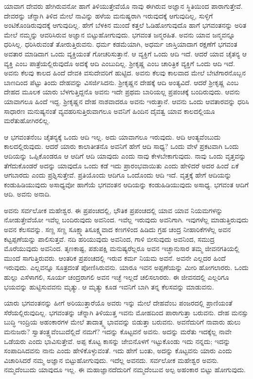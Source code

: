 ಯಾವಾಗ ದೇವರು ಹೇಗಿರುವನೋ ಹಾಗೆ ತಿಳಿಯುತ್ತೇವೆಯೊ ನಾವು ಈಗಿರುವ ಅಜ್ಞಾನ ಸ್ಥಿತಿಯಿಂದ ಪಾರಾಗುತ್ತೇವೆ. ದೇವರನ್ನು ಚೆನ್ನಾಗಿ ತಿಳಿದ ಮೇಲೆ ನಾವಿನ್ನು ಹಳೆಯ ಮನುಷ್ಯರಾಗಿ ಇರುವುದಕ್ಕೆ ಆಗುವುದಿಲ್ಲ, ಸುಳ್ಳಿಗೆ ಅಂಟಿಕೊಂಡಿರುವುದಕ್ಕೆ ಆಗುವುದಿಲ್ಲ. ಹೇಗೆ ಬೆಳಕಿನ ಮುಂದೆ ಕತ್ತಲೆ ಓಡಿಹೋಗುವುದೊ ಹಾಗೆ ಭಗವಂತನನ್ನು ಅರಿತ ಮೇಲೆ ನಮ್ಮನ್ನು ಆವರಿಸಿರುವ ಅಜ್ಞಾನ ಬಿಟ್ಟುಹೋಗುವುದು. ಭಗವಂತ ಜನ್ಮರಹಿತ. ಅವನು ಯಾವ ಜನ್ಮವನ್ನೂ ಧರಿಸಿಲ್ಲ. ಧರಿಸಿರುವಂತೆ ತೋರುತ್ತಿರುವನು. ಧರ್ಮ ಕಡಮೆಯಾಗಿ, ಅಧರ್ಮ ಜಾಸ್ತಿಯಾದಾಗ ರಕ್ಷಣೆಗೆ ಭಗವಂತ ಅವತಾರ ಮಾಡಿದಾಗ ಒಂದು ವ್ಯಕ್ತಿಯಂತೆ ಗೋಚರಿಸುತ್ತಾನೆ. ಆ ವ್ಯಕ್ತಿಗೆ ಒಂದು ಆದಿ ಇದೆ. ಆದರೆ ಯಾವ ಚೈತನ್ಯ ಆ ವ್ಯಕ್ತಿ ಎಂಬ ಪಾತ್ರೆಯಲ್ಲಿರುವುದೊ ಅದಕ್ಕೆ ಆದಿ ಎಂಬುದಿಲ್ಲ. ಶ‍್ರೀಕೃಷ್ಣ ಎಂಬ ಚಾರಿತ್ರಿಕ ವ್ಯಕ್ತಿಗೆ ಒಂದು ಆದಿ ಇದೆ. ಅವನು ಕೆಲವು ಕಾಲದ ಹಿಂದೆ ದೇವಕಿ ವಸುದೇವರಿಗೆ ಹುಟ್ಟಿದ. ಅವನು ಕೆಲವು ಕಾಲವಾದ ಮೇಲೆ ಬೇಟೆಗಾರನೊಬ್ಬನ ಬಾಣದಿಂದ ಪೆಟ್ಟು ತಿಂದು ದೇಹವನ್ನು ವಿಸರ್ಜಿಸಿದನು. ಶ‍್ರೀಕೃಷ್ಣನ ದೇಹಕ್ಕೆ ಆದಿ ಅಂತ್ಯವಿದೆ. ಆದರೆ ಶ‍್ರೀಕೃಷ್ಣ ಎಂಬ ದೇಹದ ಮೂಲಕ ಯಾರು ಬೆಳಗುತ್ತಿದ್ದನೊ ಅವನು ಇದೇ ಪ್ರಥಮ ಬಾರಿಯಲ್ಲ ಪ್ರಪಂಚಕ್ಕೆ ಬಂದಿರುವುದು. ಆವನು ಯಾವಾಗಲೂ ಹಿಂದೆ ಇದ್ದ. ಶ‍್ರೀಕೃಷ್ಣನ ದೇಹ ನಾಶವಾದರೂ ಅವನು ಇರುತ್ತಾನೆ. ಆವನು ಒಂದು ಆವತಾರವನ್ನು ಧರಿಸಿ ಸಾಧಾರಣ ಮನುಷ್ಯನಂತೆ ವ್ಯವಹರಿಸುತ್ತಿರುವಾಗಲೂ ಅವನಿಗೆ ಹಿಂದಿನ ದೈವತ್ವ ಯಾವ ಕಾಲದಲ್ಲಿಯೂ ಮರೆತುಹೋಗಿರಲಿಲ್ಲ.

ಆ ಭಗವಂತನೆಂಬ ಚೈತನ್ಯಕ್ಕೆ ಒಂದು ಆದಿ ಇಲ್ಲ. ಅದು ಯಾವಾಗಲೂ ಇರುವುದು. ಆದಿ ಆಂತ್ಯವೆಂಬುದು ಕಾಲದಲ್ಲಿರುವುದು. ಆದರೆ ಯಾರು ಕಾಲಾತೀತನೊ ಅವನಿಗೆ ಹೇಗೆ ಆದಿ ಸಾಧ್ಯ? ಒಂದು ವೇಳೆ ಪ್ರಕಟವಾಗಿ ಒಂದು ಆದಿಯನ್ನು ಒಪ್ಪಿಕೊಂಡರೂ ಆ ಆದಿಗೆ ಆದಿ ಯಾವುದು ಎಂದು ನಾವು ಕೇಳಬೇಕಾಗುವುದು. ನಾವು ಒಂದು ವೃತ್ತವನ್ನು ತೆಗೆದುಕೊಂಡರೆ ಅದನ್ನು ಯಾವುದೊ ಒಂದು ಕಡೆ ಇದು ಪ್ರಾರಂಭವಾಯಿತು ಎಂದು ಹೇಳಿದರೆ ಅದರ ಹಿಂದೆ ಏಕೆ ಆಗಬಾರದು ಎಂದು ಪ್ರಶ್ನಿಸುತ್ತೇವೆ. ಪ್ರತಿಯೊಂದು ಆದಿಗೂ ಒಂದೊಂದು ಆದಿ ಇದೆ. ವೃತ್ತಕ್ಕೆ ಹೇಗೆ ಆದಿಯನ್ನು ಕಂಡುಹಿಡಿಯುವುದು ಅಸಾಧ್ಯವೋ ಹಾಗೆಯೆ ಭಗವಂತನ ಆದಿಯನ್ನು ಕಂಡುಹಿಡಿಯುವುದು ಅಸಾಧ್ಯ. ಭಗವಂತ ಆದಿಗೆ ಆದಿ. ಅವನು ಅನಾದಿ.

\newpage

ಅವನು ಸರ್ವಲೋಕ ಮಹೇಶ್ವರ. ಈ ಪ್ರಪಂಚದಲ್ಲಿ, ಭೌತಿಕ ಪ್ರಪಂಚದಲ್ಲಿ ಯಾವ ಯಾವ ನಿಯಮಗಳನ್ನು ನೋಡುತ್ತೇವೆಯೋ ಇವೆಲ್ಲ ಬಂದಿರುವುದು ಅವನಿಂದ. ಇವೆಲ್ಲ ಇರುವುದು ಅವನಿಗಾಗಿ. ಇವುಗಳೆಲ್ಲ ಮಾಡುತ್ತಿರುವುದು ಅವನ ಕೆಲಸವನ್ನು. ಸಣ್ಣ ಸಣ್ಣ ಸೂಕ್ಷ್ಮಾತಿಸೂಕ್ಷ್ಮವಾದ ಕಣಗಳಿಂದ ಹಿಡಿದು ಗ್ರಹ ಚಂದ್ರ ನೀಹಾರಿಕೆಗಳೆಲ್ಲ ಅವನ ಕಟ್ಟಪ್ಪಣೆಯನ್ನು ಪಾಲಿಸುತ್ತವೆ. ನದಿ ಹರಿಯುವುದು ಅವನಿಂದ, ಗಾಳಿ ಬೀಸುವುದು ಅವನಿಂದ, ಸಮುದ್ರ ಮೊರೆಯುವುದು ಅವನಿಂದ. ತೃಣಕಾಷ್ಟ, ಪಶುಪಕ್ಷಿ ಮನುಷ್ಯರೆಲ್ಲರೂ ಅವನ ಇಚ್ಛಾನುಸಾರ ತಮ್ಮ ಜೀವನಗತಿಯಲ್ಲಿ ಮುಂದೆ ಸಾಗುತ್ತಿರುವರು. ಆಂತರಿಕ ಪ್ರಪಂಚದಲ್ಲಿ ಇರುವ ಕರ್ಮ ನಿಯಮ ಅವನೆ. ಅವನೇ ಎಲ್ಲದರ ಹಿಂದೆ ಇರುವುದು. ಎಲ್ಲವನ್ನೂ ಸೂತ್ರದಂತೆ ಪೋಣಿಸಿರುವನು. ಯಾರೂ ಇವನ ಅಪ್ಪಣೆಯನ್ನು ಮೀರಿ ಹೋಗಲಾರರು. ಒಂದು ಹುಲ್ಲು ಎಸೆಳಾಗಲಿ, ಸೂರ್ಯ ಚಂದ್ರರಾಗಲಿ ಅವನ ಇಚ್ಛೆ ಇಲ್ಲದೆ ಚಲಿಸಲಾರರು. ಈ ಜೀವನದಲ್ಲಿ ಎಲ್ಲರಿಗೂ ಭಯವನ್ನು ಹುಟ್ಟಿಸುವವನು ಮೃತ್ಯು. ಆ ಮೃತ್ಯು ಕೂಡ ಇವನಿಗೆ ಬಾಗಿ ತನ್ನ ಕೆಲಸವನ್ನು ಮಾಡುವನು.

ಯಾರು ಭಗವಂತನನ್ನು ಹೀಗೆ ಅರಿಯುತ್ತಾರೆಯೊ ಅವರು ಇನ್ನು ಮೇಲೆ ದೇಹವೆಂಬ ಪಂಜರದಲ್ಲಿ ಪ್ರಾಣಿಯಂತೆ ಸೆರೆಯಲ್ಲಿರುವುದಿಲ್ಲ. ಭಗವಂತನ್ನು ಚೆನ್ನಾಗಿ ತಿಳಿಯುತ್ತ ಇವನು ಮೋಹದಿಂದ ಪಾರಾಗುತ್ತಾ ಬರುವನು. ದೇಹ ಮನಸ್ಸು ಬುದ್ಧಿ ಇಂದ್ರಿಯ ಅಹಂಕಾರಗಳ ಮೇಲೆ ತಾದಾತ್ಮ್ಯ ಭಾವವನ್ನು ಬಿಡುತ್ತಾ ಬರುವನು. ಅವನೆದುರಿಗೆ ನಾವಾರು ಹುಲು ಮನುಜರು? ಸ್ವಾತಂತ್ರ್ಯವೆಂಬುದೆಲ್ಲಿದೆ ನಮಗೆ? ಇದನ್ನು ಕೊಟ್ಟವನೆ ಅವನು. ಅದನ್ನು ಮರೆತು ಇದಕ್ಕೆಲ್ಲ ನಾವೇ ಒಡೆಯರು ಎಂದು ಭಾವಿಸುತ್ತೇವೆ. ಅಪ್ಪ ಕೊಟ್ಟ ಕಾಸನ್ನು ಜೇಬಿನೊಳಗೆ ಇಟ್ಟುಕೊಂಡು ಇದು ನನ್ನದು; ಇದನ್ನು ಸಂಪಾದಿಸಿದವನು ನಾನು ಎಂದು ಹೇಳಿಕೊಳ್ಳುವಂತೆ. ಇದು ಹೇಗೆ ಬಂತು, ಅದನ್ನು ಕೊಟ್ಟವನು ಯಾರು ಎಂದು ವಿಚಾರಿಸಿದರೆ ನಮ್ಮ ಅಜ್ಞಾನ ಬಿಟ್ಟುಹೋಗುವುದು. ಇದೆಲ್ಲ ಅವನದು. ಸರ್ವಲೋಕ ಮಹೇಶ್ವರ ಅವನು. ನಮ್ಮದೆಂಬುದು ಯಾವುದೂ ಇಲ್ಲ. ಈ ಮಹಾಜ್ಞಾನದೆದುರಿಗೆ ನಮ್ಮದೆಂಬುವ ಅಲ್ಪ ಅಹಂಕಾರ ಬಿಟ್ಟು ಹೋಗುವುದು.

